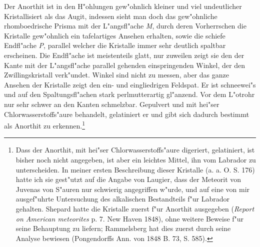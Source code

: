 \documentclass[a4paper, 11pt, oneside, german]{article}
\begin{document}
Der Anorthit ist in den H"ohlungen gew"ohnlich kleiner und viel undeutlicher Kristallisiert als das Augit, indessen sieht man doch das gew"ohnliche rhomboedrische Prisma mit der L"angsfl"ache \emph{M}, durch deren Vorherrschen die Kristalle gew"ohnlich ein tafelartiges Ansehen erhalten, sowie die schiefe Endfl"ache \emph{P}, parallel welcher die Kristalle immer sehr deutlich spaltbar erscheinen. Die Endfl"ache ist meistenteils glatt, nur zuweilen zeigt sie den der Kante mit der L"angsfl"ache parallel gehenden einspringenden Winkel, der den Zwillingskristall verk"undet. Winkel sind nicht zu messen, aber das ganze Ansehen der Kristalle zeigt den ein- und eingliedrigen Feldspat. Er ist schneewei"s und auf den Spaltungsfl"achen stark perlmutterartig gl"anzend. Vor dem L"otrohr nur sehr schwer an den Kanten schmelzbar. Gepulvert und mit hei"ser Chlorwasserstoffs"aure behandelt, gelatiniert er und gibt sich dadurch bestimmt als Anorthit zu erkennen.\footnote{Dass der Anorthit, mit hei"ser Chlorwasserstoffs"aure digeriert, gelatiniert, ist bisher noch nicht angegeben, ist aber ein leichtes Mittel, ihn vom Labrador zu unterscheiden. In meiner ersten Beschreibung dieser Kristalle (a. a. O. S. 176) hatte ich sie gest"utzt auf die Angabe von Laugier, dass der Meteorit von Juvenas von S"auren nur schwierig angegriffen w"urde, und auf eine von mir ausgef"uhrte Untersuchung des alkalischen Bestandteils f"ur Labrador gehalten. Shepard hatte die Kristalle zuerst f"ur Anorthit ausgegeben (\emph{Report on American meteorites} p. 7. New Haven 1848), ohne weitere Beweise f"ur seine Behauptung zu liefern; Rammelsberg hat dies zuerst durch seine Analyse bewiesen (Pongendorffs Ann. von 1848 B. 73, S. 585).}
\end{document}
